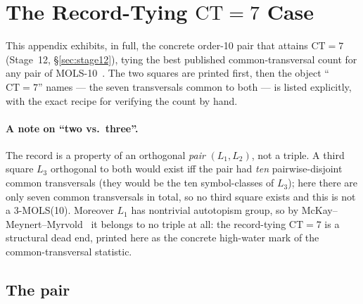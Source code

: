\documentclass[11pt,a4paper]{article}
\theoremstyle{remark}
\newcommand{\CT}{\mathrm{CT}}
\begin{document}
\appendix
\newpage
\section{The Record-Tying $\CT=7$ Case}
\label{app:ct7}

This appendix exhibits, in full, the concrete order-10 pair that attains
$\CT = 7$ (Stage~12, \S\ref{sec:stage12}), tying the best published
common-transversal count for any pair of MOLS-10~\cite{bright2022}. The two
squares are printed first, then the object ``$\CT=7$'' names --- the seven
transversals common to both --- is listed explicitly, with the exact
recipe for verifying the count by hand.

\paragraph{A note on ``two vs.\ three''.} The record is a property of an
orthogonal \emph{pair} $(L_1, L_2)$, not a triple. A third square $L_3$
orthogonal to both would exist iff the pair had \emph{ten} pairwise-disjoint
common transversals (they would be the ten symbol-classes of $L_3$); here
there are only seven common transversals in total, so no third square exists
and this is not a 3-MOLS(10). Moreover $L_1$ has nontrivial autotopism group,
so by McKay--Meynert--Myrvold~\cite{mmm2007} it belongs to no triple at all:
the record-tying $\CT=7$ is a structural dead end, printed here as the
concrete high-water mark of the common-transversal statistic.

\subsection*{The pair}
\end{document}
